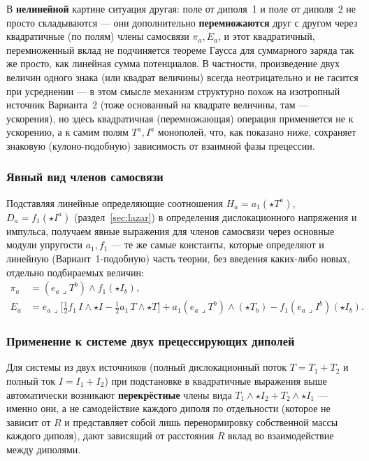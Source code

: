 \documentclass[12pt,a4paper]{article}
\begin{document}
В \textbf{нелинейной} картине ситуация другая: поле от диполя~1 и поле
от диполя~2 не просто складываются --- они дополнительно
\textbf{перемножаются} друг с другом через квадратичные (по полям)
члены самосвязи $\pi_a,E_a$, и этот квадратичный, перемноженный вклад
не подчиняется теореме Гаусса для суммарного заряда так же просто,
как линейная сумма потенциалов. В частности, произведение двух величин
одного знака (или квадрат величины) всегда неотрицательно и не
гасится при усреднении --- в этом смысле механизм структурно похож на
изотропный источник Варианта~2 (тоже основанный на квадрате величины,
там --- ускорения), но здесь квадратичная (перемножающая) операция
применяется не к ускорению, а к самим полям $T^a,I^a$ монополей, что,
как показано ниже, сохраняет знаковую (кулоно-подобную) зависимость от
взаимной фазы прецессии.

\subsubsection{Явный вид членов самосвязи}

Подставляя линейные определяющие соотношения $H_a=a_1(\star T^a)$,
$D_a=f_1(\star I^a)$ (раздел~\ref{sec:lazar}) в определения
дислокационного напряжения и импульса, получаем явные выражения для
членов самосвязи через основные модули упругости $a_1,f_1$ --- те же
самые константы, которые определяют и линейную (Вариант~1-подобную)
часть теории, без введения каких-либо новых, отдельно подбираемых
величин:
\begin{align}
\pi_a&=(e_a\lrcorner T^b)\wedge f_1(\star I_b),\\
E_a&=e_a\lrcorner\Big[\tfrac12 f_1\, I\wedge\star I-\tfrac12 a_1\, T\wedge\star T\Big]
+a_1(e_a\lrcorner T^b)\wedge(\star T_b)-f_1(e_a\lrcorner I^b)(\star I_b).
\end{align}

\subsubsection{Применение к системе двух прецессирующих диполей}

Для системы из двух источников (полный дислокационный поток $T=T_1+T_2$
и полный ток $I=I_1+I_2$) при подстановке в квадратичные выражения выше
автоматически возникают \textbf{перекрёстные} члены вида
$T_1\wedge\star I_2+T_2\wedge\star I_1$ --- именно они, а не самодействие
каждого диполя по отдельности (которое не зависит от $R$ и представляет
собой лишь перенормировку собственной массы каждого диполя), дают
зависящий от расстояния $R$ вклад во взаимодействие между диполями.
\end{document}
